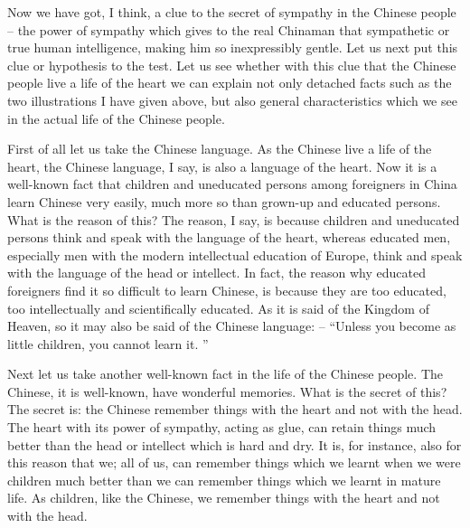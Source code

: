 Now we have got, I think, a clue to the secret of sympathy in the Chinese people -- the power of sympathy which gives to the real Chinaman that sympathetic or true human intelligence, making him so inexpressibly gentle. Let us next put this clue or hypothesis to the test. Let us see whether with this clue that the Chinese people live a life of the heart we can explain not only detached facts such as the two illustrations I have given above, but also general characteristics which we see in the actual life of the Chinese people.

First of all let us take the Chinese language. As the Chinese live a life of the heart, the Chinese language, I say, is also a language of the heart. Now it is a well-known fact that children and uneducated persons among foreigners in China learn Chinese very easily, much more so than grown-up and educated persons. What is the reason of this? The reason, I say, is because children and uneducated persons think and speak with the language of the heart, whereas educated men, especially men with the modern intellectual education of Europe, think and speak with the language of the head or intellect. In fact, the reason why educated foreigners find it so difficult to learn Chinese, is because they are too educated, too intellectually and scientifically educated. As it is said of the Kingdom of Heaven, so it may also be said of the Chinese language: -- ``Unless you become as little children, you cannot learn it. ''

Next let us take another well-known fact in the life of the Chinese people.
The Chinese, it is well-known, have wonderful memories.
What is the secret of this?
The secret is: the Chinese remember things with the heart and not with the head.
The heart with its power of sympathy, acting as glue,
can retain things much better than the head or intellect which is hard and dry.
It is, for instance, also for this reason that we;
all of us, can remember things which we learnt when we were children much better than we can remember things which we learnt in mature life.
As children, like the Chinese, we remember things with the heart and not with the head.

